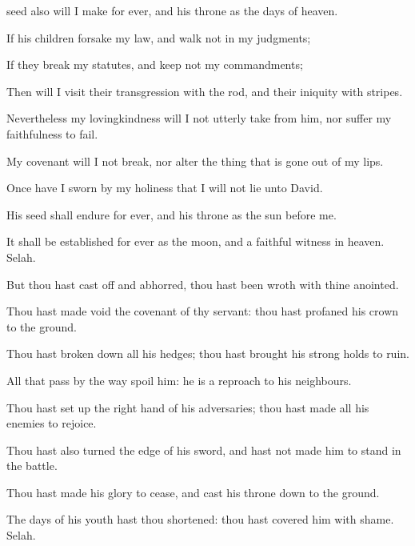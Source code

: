 {seed also will I
make
{} for
ever, and his
throne as the
days of
heaven.
\par }{\Q {}If his
children
forsake my
law, and
walk not in my
judgments;
\par }{\Q {}If they
break my
statutes, and
keep not my
commandments;
\par }{\Q {}Then will I
visit their
transgression with the
rod, and their
iniquity with
stripes.
\par }{\Q {}Nevertheless my
lovingkindness will I not utterly
take from him, nor suffer my
faithfulness to
fail.
\par }{\Q {}My
covenant will I not
break, nor
alter the thing that is gone
out of my
lips.
\par }{\Q {}Once have I
sworn by my
holiness that I will not
lie unto
David.
\par }{\Q {}His
seed shall endure for
ever, and his
throne as the
sun before me.
\par }{\Q {}It shall be
established for
ever as the
moon, and
{} a
faithful
witness in
heaven.
Selah.
\par }{\BB \par }{\Q {}But thou hast cast
off and
abhorred, thou hast been
wroth with thine
anointed.
\par }{\Q {}Thou hast made
void the
covenant of thy
servant: thou hast
profaned his
crown
{} to the
ground.
\par }{\Q {}Thou hast broken
down all his
hedges; thou hast
brought his strong
holds to
ruin.
\par }{\Q {}All that pass
by the
way
spoil him: he is a
reproach to his
neighbours.
\par }{\Q {}Thou hast set
up the right
hand of his
adversaries; thou hast made all his
enemies to
rejoice.
\par }{\Q {}Thou hast also
turned the
edge of his
sword, and hast not made him to
stand in the
battle.
\par }{\Q {}Thou hast made his
glory to
cease, and
cast his
throne
down to the
ground.
\par }{\Q {}The
days of his
youth hast thou
shortened: thou hast
covered him with
shame.
Selah.
}
